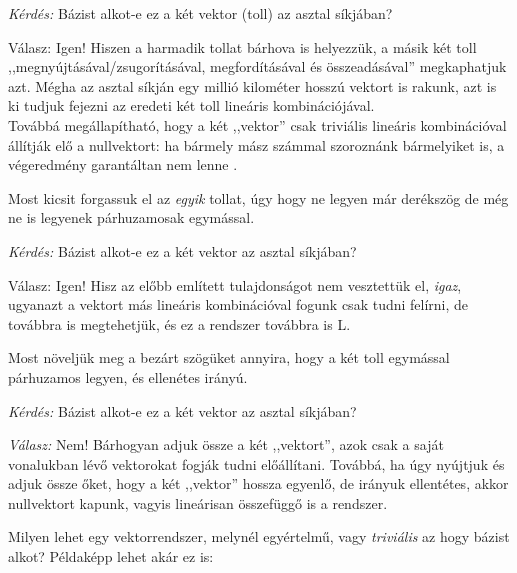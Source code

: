 \documentclass[a4paper,11.5pt]{article}
\begin{document}
	\begin{center}
		\emph{Kérdés:} Bázist alkot-e ez a két vektor (toll) az asztal síkjában? 
	\end{center}
	
	Válasz: Igen! Hiszen a harmadik tollat bárhova is helyezzük,  a másik két toll ,,megnyújtásával/zsugorításával, megfordításával és összeadásával'' megkaphatjuk azt. Mégha az asztal síkján egy millió kilométer hosszú vektort is rakunk, azt is ki tudjuk fejezni az eredeti két toll lineáris kombinációjával.\\
	Továbbá megállapítható, hogy a két ,,vektor'' csak triviális lineáris kombinációval állítják elő a nullvektort: ha bármely mász számmal szoroznánk bármelyiket is, a végeredmény garantáltan nem lenne \0.
	
	\medskip
	Most kicsit forgassuk el az \emph{egyik} tollat, úgy hogy ne legyen már derékszög de még ne is legyenek párhuzamosak egymással.
	
	\begin{center}
		\emph{Kérdés:} Bázist alkot-e ez a két vektor az asztal síkjában?
	\end{center}
	
	Válasz: Igen! Hisz az előbb említett tulajdonságot nem vesztettük el, \emph{igaz}, ugyanazt a vektort más lineáris kombinációval fogunk csak tudni felírni, de továbbra is megtehetjük, és ez a rendszer továbbra is L.
	
	Most növeljük meg a bezárt szögüket annyira, hogy a két toll egymással párhuzamos legyen, és ellenétes irányú.
	\begin{center}
		\emph{Kérdés:} Bázist alkot-e ez a két vektor az asztal síkjában?
	\end{center}
	
	\emph{Válasz:} Nem! Bárhogyan adjuk össze a két ,,vektort'', azok csak a saját vonalukban lévő vektorokat fogják tudni előállítani. Továbbá, ha úgy nyújtjuk és adjuk össze őket, hogy a két ,,vektor'' hossza egyenlő, de irányuk ellentétes, akkor nullvektort kapunk, vagyis lineárisan összefüggő is a rendszer.
	
	Milyen lehet egy vektorrendszer, melynél egyértelmű, vagy \emph{triviális} az hogy bázist alkot?
	Példaképp lehet akár ez is:
	
\end{document}
